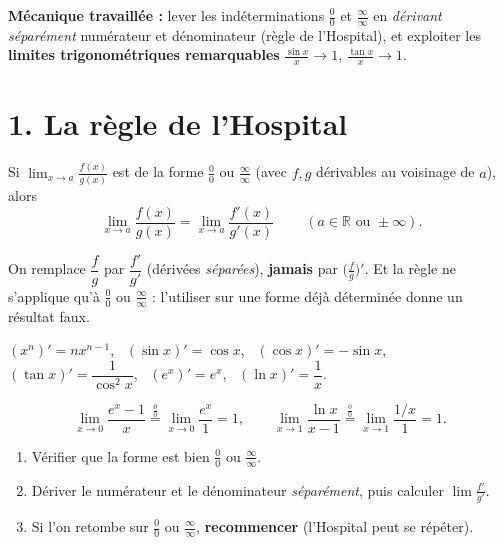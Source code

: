 \documentclass[11pt,a4paper]{article}
\newcommand{\R}{\mathbb{R}}
\begin{document}
\begin{tcolorbox}[boxbase,colback=primary!12,colframe=primary,
   title={\Large Thème 5 — Règle de l'Hospital \& limites trigonométriques}]
\textbf{Mécanique travaillée :} lever les indéterminations $\frac00$ et $\frac{\infty}{\infty}$ en
\emph{dérivant séparément} numérateur et dénominateur (règle de l'Hospital), et exploiter les
\textbf{limites trigonométriques remarquables} $\frac{\sin x}{x}\to 1$, $\frac{\tan x}{x}\to 1$.
\end{tcolorbox}

\section{1. La règle de l'Hospital}

\begin{idee}
Si $\displaystyle\lim_{x\to a}\frac{f(x)}{g(x)}$ est de la forme $\frac00$ ou $\frac{\infty}{\infty}$ (avec
$f,g$ dérivables au voisinage de $a$), alors
\[ \boxed{\ \lim_{x\to a}\frac{f(x)}{g(x)}=\lim_{x\to a}\frac{f'(x)}{g'(x)}\ }\qquad(a\in\R\text{ ou }\pm\infty). \]
\end{idee}

\begin{attention}
On remplace $\dfrac fg$ par $\dfrac{f'}{g'}$ (dérivées \emph{séparées}), \textbf{jamais} par
$\bigl(\frac fg\bigr)'$. Et la règle ne s'applique qu'à $\frac00$ ou $\frac{\infty}{\infty}$ :
l'utiliser sur une forme déjà déterminée donne un résultat faux.
\end{attention}

\begin{astuce}
$(x^n)'=n x^{n-1}$, \ $(\sin x)'=\cos x$, \ $(\cos x)'=-\sin x$, \ $(\tan x)'=\dfrac{1}{\cos^2 x}$, \
$(e^x)'=e^x$, \ $(\ln x)'=\dfrac1x$.
\end{astuce}

\begin{exemple}
\[ \lim_{x\to 0}\frac{e^x-1}{x}\overset{\frac00}{=}\lim_{x\to0}\frac{e^x}{1}=1,\qquad
   \lim_{x\to 1}\frac{\ln x}{x-1}\overset{\frac00}{=}\lim_{x\to1}\frac{1/x}{1}=1. \]
\end{exemple}

\begin{methode}
\begin{enumerate}[leftmargin=1.9em,topsep=2pt,itemsep=1pt]
  \item Vérifier que la forme est bien $\frac00$ ou $\frac{\infty}{\infty}$.
  \item Dériver le numérateur et le dénominateur \emph{séparément}, puis calculer $\lim\frac{f'}{g'}$.
  \item Si l'on retombe sur $\frac00$ ou $\frac{\infty}{\infty}$, \textbf{recommencer} (l'Hospital peut se répéter).
\end{enumerate}
\end{methode}
\end{document}
